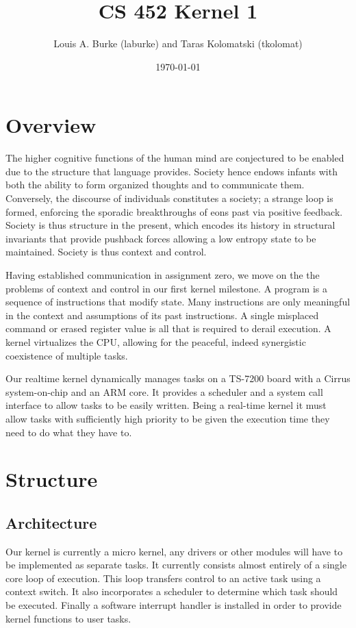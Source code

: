 \documentclass{article}
\title{CS 452 Kernel 1}
\author{Louis A. Burke (laburke) and Taras Kolomatski (tkolomat)}
\date{\today}
\begin{document}
\begingroup
\let\newpage\relax%
\maketitle
\endgroup

\section*{Overview}

The higher cognitive functions of the human mind are conjectured to be enabled
due to the structure that language provides. Society hence endows infants with
both the ability to form organized thoughts and to communicate them.
Conversely, the discourse of individuals constitutes a society; a strange loop
is formed, enforcing the sporadic breakthroughs of eons past via positive
feedback. Society is thus structure in the present, which encodes its history in
structural invariants that provide pushback forces allowing a low entropy state
to be maintained. Society is thus context and control.

Having established communication in assignment zero, we move on the the problems
of context and control in our first kernel milestone. A program is a sequence of
instructions that modify state. Many instructions are only meaningful in the
context and assumptions of its past instructions. A single misplaced command or
erased register value is all that is required to derail execution. A kernel
virtualizes the CPU, allowing for the peaceful, indeed synergistic coexistence
of multiple tasks.

Our realtime kernel dynamically manages tasks on a TS-7200 board with a Cirrus
system-on-chip and an ARM core. It provides a scheduler and a system call
interface to allow tasks to be easily written. Being a real-time kernel it must
allow tasks with sufficiently high priority to be given the execution time they
need to do what they have to.

\section*{Structure}

\subsection*{Architecture}

Our kernel is currently a micro kernel, any drivers or other modules will have
to be implemented as separate tasks. It currently consists almost entirely of a
single core loop of execution. This loop transfers control to an active task
using a context switch. It also incorporates a scheduler to determine which task
should be executed. Finally a software interrupt handler is installed in order
to provide kernel functions to user tasks.
\end{document}
